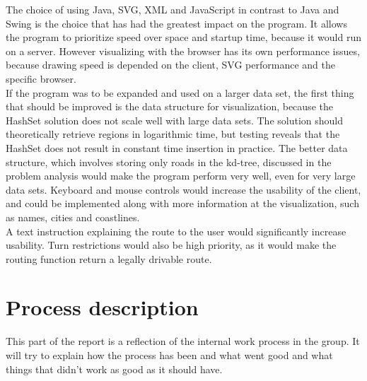 \documentclass[a4paper,10pt,titlepage]{article}
\begin{document}
The choice of using Java, SVG, XML and JavaScript in contrast to Java and Swing is the choice that has had the greatest impact on the program. It allows the program to prioritize speed over space and startup time, because it would run on a server. However visualizing with the browser has its own performance issues, because drawing speed is depended on the client, SVG performance and the specific browser.\\
If the program was to be expanded and used on a larger data set, the first thing that should be improved is the data structure for visualization, because the HashSet solution does not scale well with large data sets. The solution should theoretically retrieve regions in logarithmic time, but testing reveals that the HashSet does not result in constant time insertion in practice. The better data structure, which involves storing only roads in the kd-tree, discussed in the problem analysis would make the program perform very well, even for very large data sets. Keyboard and mouse controls would increase the usability of the client, and could be implemented along with more information at the visualization, such as names, cities and coastlines.\\
A text instruction explaining the route to the user would significantly increase usability.  Turn restrictions would also be high priority, as it would make the routing function return a legally drivable route.\\
 		
		\newpage

	\section{Process description}
	This part of the report is a reflection of the internal work process in the group. It will try to explain how the process has been and what went good and what things that didn't work as good as it should have.
	
\end{document}
